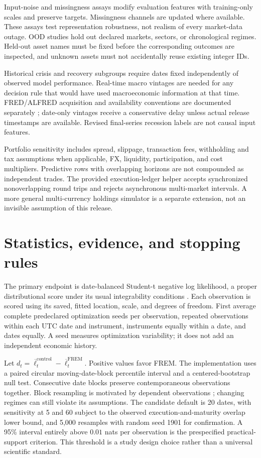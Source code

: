 \documentclass[11pt,a4paper]{article}
\begin{document}
Input-noise and missingness assays modify evaluation features with training-only scales and preserve targets. Missingness channels are updated where available. These assays test representation robustness, not realism of every market-data outage. OOD studies hold out declared markets, sectors, or chronological regimes. Held-out asset names must be fixed before the corresponding outcomes are inspected, and unknown assets must not accidentally reuse existing integer IDs.

Historical crisis and recovery subgroups require dates fixed independently of observed model performance. Real-time macro vintages are needed for any decision rule that would have used macroeconomic information at that time. FRED/ALFRED acquisition and availability conventions are documented separately \citep{fredapi}; date-only vintages receive a conservative delay unless actual release timestamps are available. Revised final-series recession labels are not causal input features.

Portfolio sensitivity includes spread, slippage, transaction fees, withholding and tax assumptions when applicable, FX, liquidity, participation, and cost multipliers. Predictive rows with overlapping horizons are not compounded as independent trades. The provided execution-ledger helper accepts synchronized nonoverlapping round trips and rejects asynchronous multi-market intervals. A more general multi-currency holdings simulator is a separate extension, not an invisible assumption of this release.

\section{Statistics, evidence, and stopping rules}

The primary endpoint is date-balanced Student-t negative log likelihood, a proper distributional score under its usual integrability conditions \citep{gneiting2007}. Each observation is scored using its saved, fitted location, scale, and degrees of freedom. First average complete predeclared optimization seeds per observation, repeated observations within each UTC date and instrument, instruments equally within a date, and dates equally. A seed measures optimization variability; it does not add an independent economic history.

Let $d_t=\overline\ell_t^{\mathrm{control}}-\overline\ell_t^{\mathrm{FREM}}$. Positive values favor FREM. The implementation uses a paired circular moving-date-block percentile interval and a centered-bootstrap null test. Consecutive date blocks preserve contemporaneous observations together. Block resampling is motivated by dependent observations \citep{kuensch1989}; changing regimes can still violate its assumptions. The candidate default is 20 dates, with sensitivity at 5 and 60 subject to the observed execution-and-maturity overlap lower bound, and 5,000 resamples with random seed 1901 for confirmation. A 95\% interval entirely above $0.01$ nats per observation is the prespecified practical-support criterion. This threshold is a study design choice rather than a universal scientific standard.
\end{document}

